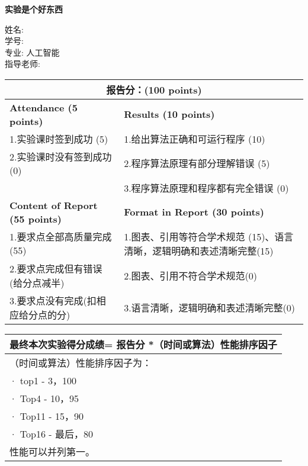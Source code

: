 \documentclass[12pt]{article}
\begin{document}
\begin{titlepage}
    \centering
    \vspace*{2cm}
    
    \Huge
    \textbf{实验是个好东西}
        
    \vspace{2cm}
        
    \Large
    姓名:  \\ \vspace{0.5cm}
    学号: \\ \vspace{0.5cm}
    专业: 人工智能\\ \vspace{0.5cm}
    指导老师: \\

    
    \vfill
    \normalsize
    
    \begin{center}
    \hspace*{-1.1cm}
    \begin{tabular}{|p{8cm}|p{8cm}|}
    \hline
    \multicolumn{2}{|c|}{{\large \textbf{报告分：(100 points)}}} \\
    \hline
    \textbf{Attendance (5 points)} & \textbf{Results (10 points)} \\
    \hline
    1.实验课时签到成功 (5) & 1.给出算法正确和可运行程序 (10) \\
    2.实验课时没有签到成功 (0) & 2.程序算法原理有部分理解错误 (5) \\
    & 3.程序算法原理和程序都有完全错误 (0) \\
    \hline
    \textbf{Content of Report (55 points)} & \textbf{Format in Report (30 points)} \\
    \hline
    1.要求点全部高质量完成(55) & 1.图表、引用等符合学术规范 (15)、语言清晰，逻辑明确和表述清晰完整(15) \\
    2.要求点完成但有错误(给分点减半) & 2.图表、引用不符合学术规范(0) \\
    3.要求点没有完成(扣相应给分点的分) & 3.语言清晰，逻辑明确和表述清晰完整(0) \\
    \hline
    \end{tabular}
    \end{center}

    \begin{center}
    \begin{tabular}{|l|}
    \hline
    最终本次实验得分成绩= 报告分 *（时间或算法）性能排序因子 \\
    \hline
    （时间或算法）性能排序因子为： \\
    · top1 - 3，100 \\
    · Top4 - 10，95 \\
    · Top11 - 15，90 \\
    · Top16 - 最后，80 \\
    性能可以并列第一。 \\
    \hline
    \end{tabular}
    \end{center}


\end{titlepage}
\end{document}
